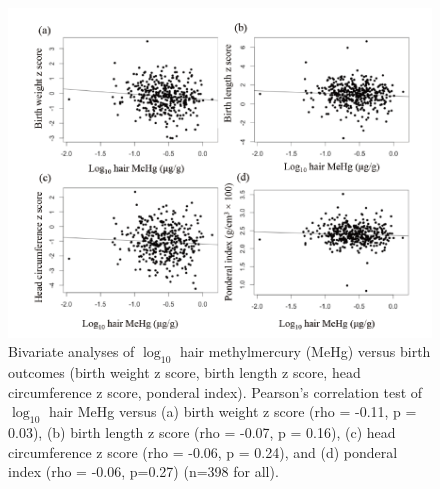 \begin{figure}
  \centering
    \label{fig:Fig316}
  \includegraphics[scale=1]{Figures/Fig316.pdf}
  \caption[Bivariate analyses of $\log_{10}$ hair methylmercury versus birth outcomes (birth weight z score, birth length z score, head circumference z score, ponderal index)]{Bivariate analyses of $\log_{10}$ hair methylmercury (MeHg) versus birth outcomes (birth weight z score, birth length z score, head circumference z score, ponderal index). Pearson's correlation test of $\log_{10}$ hair MeHg versus (a) birth weight z score (rho = -0.11, p = 0.03), (b) birth length z score (rho = -0.07, p = 0.16), (c) head circumference z score (rho = -0.06, p = 0.24), and (d) ponderal index (rho = -0.06, p=0.27) (n=398 for
all).}
\end{figure}


